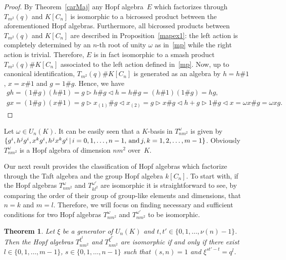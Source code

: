 \documentclass[pdftex]{sigma}
\numberwithin{equation}{section}
\newtheorem{Theorem}{Theorem}[section]
\begin{document}
\begin{proof} By Theorem~\ref{carMaj} any Hopf algebra~$E$ which factorizes through $T_{m^{2}}(q)$ and $K[C_n]$ is isomorphic to a bicrossed product
between the aforementioned Hopf algebras. Furthermore, all bicrossed products between $T_{m^{2}}(q)$ and $K[C_n]$ are described in Proposition~\ref{mapex1}: the left action is completely determined by an $n$-th root of unity $\omega$ as in~\eqref{mp} while the right action is trivial. Therefore, $E$ is in fact isomorphic to a smash product $T_{m^{2}}(q) \# K[C_n]$ associated to the left action defined in~\eqref{mp}. Now, up to canonical identification, $T_{m^{2}}(q) \# K[C_n]$ is generated as an algebra by $h = h \# 1$, $x = x \# 1$ and $g = 1\# g$. Hence, we have
\begin{gather*}
gh = (1\# g) (h \# 1)= g \triangleright h \# g \triangleleft h = h \# g = (h \# 1)(1 \# g) = hg,\\
g x = (1 \# g) (x \# 1) = g \triangleright x_{(1)}
\# g \triangleleft x_{(2)} = g \triangleright x \# g \triangleleft h + g \triangleright 1 \# g \triangleleft x =\omega x \# g = \omega x g. \tag*{\qed}
\end{gather*}\renewcommand{\qed}{}
\end{proof}
\begin{Remark}Let $\omega \in U_{n}(K)$. It can be easily seen that a $K$-basis in $T_{nm^{2}}^ {\omega}$ is given by $\{ g^{i}, h^{j} g^{i},
 x^{k} g^{i}, h^{j} x^{k} g^{i} \,| \,i = 0, 1,\dots, n-1, \,{\rm and}\, j, k = 1, 2,\dots, m-1 \}$. Obviously $T_{nm^{2}}^ {\omega}$ is a Hopf algebra of dimension $nm^{2}$ over~$K$.
\end{Remark}

Our next result provides the classification of Hopf algebras which factorize through the Taft algebra and the group Hopf algebra $k[C_{n}]$. To start with, if the Hopf algebras $T_{nm^{2}}^{\omega}$ and $T_{kl^{2}}^ {\omega '}$ are isomorphic it is straightforward to see, by comparing the order of their group of group-like elements and dimensions, that $n=k$ and $m=l$. Therefore, we will focus on finding necessary and sufficient conditions for two Hopf algebras $T_{nm^{2}}^ {\omega}$ and $T_{nm^{2}}^ {\omega '}$ to be isomorphic.

\begin{Theorem}\label{izo} Let $\xi$ be a generator of $U_n (K)$ and $t, t' \in \{ 0, 1,\dots, \nu (n) -1 \}$. Then the Hopf algebras $T_{nm^{2}}^ {\xi^{t}}$ and $T_{nm^{2}}^ {\xi^{t'}}$ are isomorphic if and only if there exist $l \in \{ 0, 1,\dots, m-1 \}$, $s \in \{ 0, 1,\dots, n-1 \}$ such that $(s, n) = 1$ and $\xi^{st' - t} = q^{l}$.
\end{Theorem}
\end{document}
